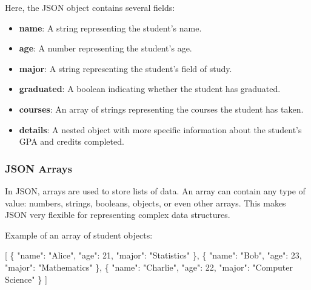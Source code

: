 \documentclass[
  letterpaper,
  DIV=11,
  numbers=noendperiod]{scrreprt}
\newenvironment{Shaded}{\begin{snugshade}}{\end{snugshade}}
\newcommand{\DataTypeTok}[1]{\textcolor[rgb]{0.68,0.00,0.00}{#1}}
\newcommand{\DecValTok}[1]{\textcolor[rgb]{0.68,0.00,0.00}{#1}}
\newcommand{\FunctionTok}[1]{\textcolor[rgb]{0.28,0.35,0.67}{#1}}
\newcommand{\OtherTok}[1]{\textcolor[rgb]{0.00,0.23,0.31}{#1}}
\newcommand{\StringTok}[1]{\textcolor[rgb]{0.13,0.47,0.30}{#1}}
\providecommand{\tightlist}{%
  \setlength{\itemsep}{0pt}\setlength{\parskip}{0pt}}\usepackage{longtable,booktabs,array}
\begin{document}
Here, the JSON object contains several fields:

\begin{itemize}
\tightlist
\item
  \textbf{name}: A string representing the student's name.
\item
  \textbf{age}: A number representing the student's age.
\item
  \textbf{major}: A string representing the student's field of study.
\item
  \textbf{graduated}: A boolean indicating whether the student has
  graduated.
\item
  \textbf{courses}: An array of strings representing the courses the
  student has taken.
\item
  \textbf{details}: A nested object with more specific information about
  the student's GPA and credits completed.
\end{itemize}

\hypertarget{json-arrays}{%
\subsubsection{JSON Arrays}\label{json-arrays}}

In JSON, arrays are used to store lists of data. An array can contain
any type of value: numbers, strings, booleans, objects, or even other
arrays. This makes JSON very flexible for representing complex data
structures.

Example of an array of student objects:

\begin{Shaded}
\begin{Highlighting}[]
\OtherTok{[}
    \FunctionTok{\{}
        \DataTypeTok{"name"}\FunctionTok{:} \StringTok{"Alice"}\FunctionTok{,}
        \DataTypeTok{"age"}\FunctionTok{:} \DecValTok{21}\FunctionTok{,}
        \DataTypeTok{"major"}\FunctionTok{:} \StringTok{"Statistics"}
    \FunctionTok{\}}\OtherTok{,}
    \FunctionTok{\{}
        \DataTypeTok{"name"}\FunctionTok{:} \StringTok{"Bob"}\FunctionTok{,}
        \DataTypeTok{"age"}\FunctionTok{:} \DecValTok{23}\FunctionTok{,}
        \DataTypeTok{"major"}\FunctionTok{:} \StringTok{"Mathematics"}
    \FunctionTok{\}}\OtherTok{,}
    \FunctionTok{\{}
        \DataTypeTok{"name"}\FunctionTok{:} \StringTok{"Charlie"}\FunctionTok{,}
        \DataTypeTok{"age"}\FunctionTok{:} \DecValTok{22}\FunctionTok{,}
        \DataTypeTok{"major"}\FunctionTok{:} \StringTok{"Computer Science"}
    \FunctionTok{\}}
\OtherTok{]}
\end{Highlighting}
\end{Shaded}
\end{document}
